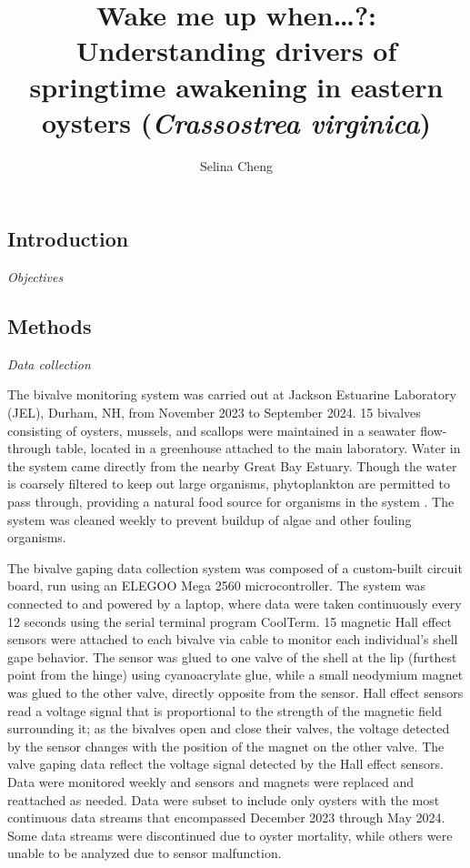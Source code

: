 \documentclass[
  letterpaper,
  DIV=11,
  numbers=noendperiod]{scrartcl}
\title{Wake me up when\ldots?: Understanding drivers of springtime
awakening in eastern oysters (\emph{Crassostrea virginica})}
\author{Selina Cheng}
\date{}
\begin{document}
\maketitle

\subsection{Introduction}\label{introduction}

\emph{Objectives}

\subsection{Methods}\label{methods}

\emph{Data collection}

The bivalve monitoring system was carried out at Jackson Estuarine
Laboratory (JEL), Durham, NH, from November 2023 to September 2024. 15
bivalves consisting of oysters, mussels, and scallops were maintained in
a seawater flow-through table, located in a greenhouse attached to the
main laboratory. Water in the system came directly from the nearby Great
Bay Estuary. Though the water is coarsely filtered to keep out large
organisms, phytoplankton are permitted to pass through, providing a
natural food source for organisms in the system . The system was cleaned
weekly to prevent buildup of algae and other fouling organisms.

The bivalve gaping data collection system was composed of a custom-built
circuit board, run using an ELEGOO Mega 2560 microcontroller. The system
was connected to and powered by a laptop, where data were taken
continuously every 12 seconds using the serial terminal program
CoolTerm. 15 magnetic Hall effect sensors were attached to each bivalve
via cable to monitor each individual's shell gape behavior. The sensor
was glued to one valve of the shell at the lip (furthest point from the
hinge) using cyanoacrylate glue, while a small neodymium magnet was
glued to the other valve, directly opposite from the sensor. Hall effect
sensors read a voltage signal that is proportional to the strength of
the magnetic field surrounding it; as the bivalves open and close their
valves, the voltage detected by the sensor changes with the position of
the magnet on the other valve. The valve gaping data reflect the voltage
signal detected by the Hall effect sensors. Data were monitored weekly
and sensors and magnets were replaced and reattached as needed. Data
were subset to include only oysters with the most continuous data
streams that encompassed December 2023 through May 2024. Some data
streams were discontinued due to oyster mortality, while others were
unable to be analyzed due to sensor malfunction.
\end{document}

